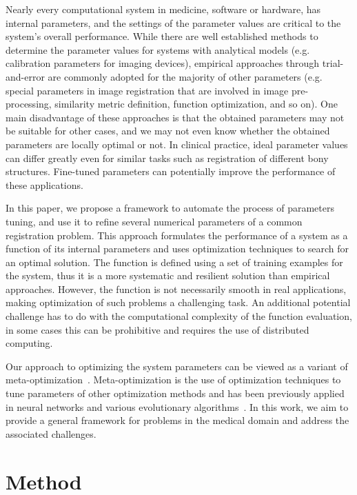 \documentclass[]{spie}  %
\begin{document}
Nearly every computational system in medicine, software or hardware, has internal parameters, and the settings of the parameter values are critical to the system's overall performance. While there are well established methods to determine the parameter values for systems with analytical models (e.g. calibration parameters for imaging devices), empirical approaches through trial-and-error are commonly adopted for the majority of other parameters (e.g. special parameters in image registration that are involved in image pre-processing, similarity metric definition, function optimization, and so on). One main disadvantage of these approaches is that the obtained parameters may not be suitable for other cases, and we may not even know whether the obtained parameters are locally optimal or not. In clinical practice, ideal parameter values can differ greatly even for similar tasks such as registration of different bony structures. Fine-tuned parameters can potentially improve the performance of these applications.

In this paper, we propose a framework to automate the process of parameters tuning, and use it to refine several numerical parameters of a common registration problem. This approach formulates the performance of a system as a function of its internal parameters and uses optimization techniques to search for an optimal solution. The function is defined using a set of training examples for the system, thus it is a more systematic and resilient solution than empirical approaches. However, the function is not necessarily smooth in real applications, making optimization of such problems a challenging task. An additional potential challenge has to do with the computational complexity of the function evaluation, in some cases this can be prohibitive and requires the use of distributed computing.

Our approach to optimizing the system parameters can be viewed as a variant of meta-optimization~\cite{metaopt}. Meta-optimization is the use of optimization techniques to tune parameters of other optimization methods and has been previously applied in neural networks and various evolutionary algorithms~\cite{smit09:ece}. In this work, we aim to provide a general framework for problems in the medical domain and address the associated challenges.

\section{Method} 
\end{document}

